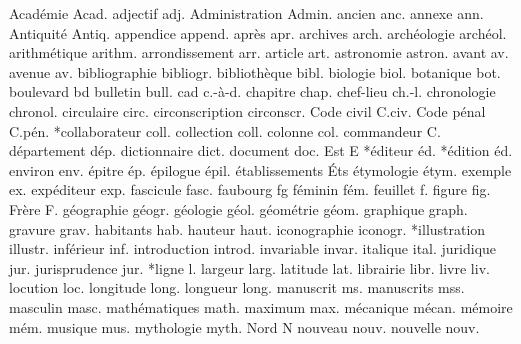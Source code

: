 {Académie}          Acad.%
adjectif            adj.%
{Administration}    Admin.%
ancien              anc.%
annexe              ann.%
{Antiquité}         Antiq.%
appendice           append.%
après               apr.%
archives            arch.%
archéologie         archéol.%
arithmétique        arithm.%
arrondissement      arr.%
article             art.%
astronomie          astron.%
avant               av.%
avenue              av.%
bibliographie       bibliogr.%
bibliothèque    bibl.%
biologie            biol.%
botanique           bot.%
boulevard           bd%
bulletin            bull.%
cad                 \noexpand\hbox{c.-à-d.}%
chapitre            chap.%
chef-lieu           ch.-l.%
chronologie         chronol.%
circulaire          circ.%
circonscription     circonscr.%
{Code civil}        C.civ.%
{Code pénal}        C.pén.%
*collaborateur      coll.%
collection          coll.%
colonne             col.%
commandeur          C.%
département         dép.%
dictionnaire        dict.%
document            doc.%
{Est}               E%
*éditeur            éd.%
*édition            éd.%
environ             env.%
épitre              ép.%
épilogue            épil.%
établissements      Éts%
étymologie          étym.%
exemple             ex.%
expéditeur          exp.%
fascicule           fasc.%
faubourg            fg%
féminin             fém.%
feuillet            f.%
figure              fig.%
Frère               F.%
géographie          géogr.%
géologie            géol.%
géométrie           géom.%
graphique           graph.%
gravure             grav.%
habitants           hab.%
hauteur             haut.%
iconographie        iconogr.%
*illustration       illustr.%
inférieur           inf.%
introduction        introd.%
invariable          invar.%
italique            ital.%
juridique           jur.%
jurisprudence       jur.%
*ligne              l.%
largeur             larg.%
latitude            lat.%
librairie           libr.%
livre               liv.%
locution            loc.%
longitude           long.%
longueur            long.%
manuscrit           ms.%
manuscrits          mss.%
masculin            masc.%
mathématiques       math.%
maximum             max.%
mécanique           mécan.%
mémoire             mém.%
musique             mus.%
mythologie          myth.%
{Nord}              N%
nouveau             nouv.%
nouvelle            nouv.%
